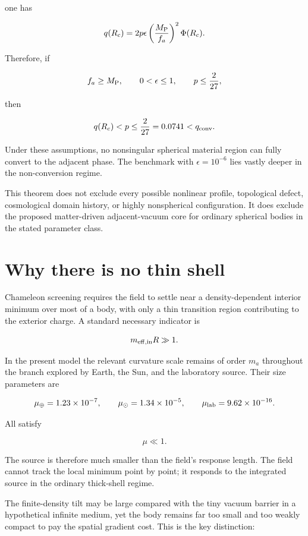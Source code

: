 \documentclass[11pt,a4paper]{article}
\begin{document}
one has

\[
q(R_c)
=
2p\epsilon
\left(\frac{M_{\rm P}}{f_a}\right)^2
\Phi(R_c).
\]

Therefore, if

\[
f_a\ge M_{\rm P},
\qquad
0<\epsilon\le1,
\qquad
p\le\frac{2}{27},
\]

then

\[
q(R_c)<p\le\frac{2}{27}=0.0741<q_{\rm conv}.
\]

Under these assumptions, no nonsingular spherical material region can
fully convert to the adjacent phase. The benchmark with
\(\epsilon=10^{-6}\) lies vastly deeper in the non-conversion regime.

This theorem does not exclude every possible nonlinear profile,
topological defect, cosmological domain history, or highly nonspherical
configuration. It does exclude the proposed matter-driven
adjacent-vacuum core for ordinary spherical bodies in the stated
parameter class.



\section{Why there is no thin
shell}\label{why-there-is-no-thin-shell}

Chameleon screening requires the field to settle near a
density-dependent interior minimum over most of a body, with only a thin
transition region contributing to the exterior charge. A standard
necessary indicator is

\[
m_{\rm eff,in}R\gg1.
\]

In the present model the relevant curvature scale remains of order
\(m_a\) throughout the branch explored by Earth, the Sun, and the
laboratory source. Their size parameters are

\[
\mu_{\oplus}=1.23\times10^{-7},
\qquad
\mu_\odot=1.34\times10^{-5},
\qquad
\mu_{\rm lab}=9.62\times10^{-16}.
\]

All satisfy

\[
\mu\ll1.
\]

The source is therefore much smaller than the field's response length.
The field cannot track the local minimum point by point; it responds to
the integrated source in the ordinary thick-shell regime.

The finite-density tilt may be large compared with the tiny vacuum
barrier in a hypothetical infinite medium, yet the body remains far too
small and too weakly compact to pay the spatial gradient cost. This is
the key distinction:
\end{document}
